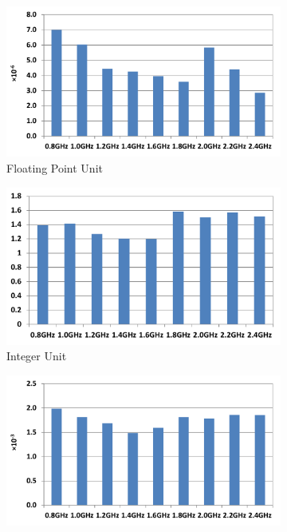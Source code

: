 \begin{figure}[htb]
   \centering
    \begin{subfigure}{.48\textwidth}
        \centering
        \includegraphics[width=\textwidth]{Chapter3/Figs/activity/FP.pdf}
        \caption{Floating Point Unit}
        \label{fig: lbmfp}
    \end{subfigure}
    \begin{subfigure}{.48\textwidth}
        \centering
        \includegraphics[width=\textwidth]{Chapter3/Figs/activity/INT.pdf}
        \caption{Integer Unit}
        \label{fig: lbmINT}
    \end{subfigure}
    \begin{subfigure}{.48\textwidth}
        \centering
        \includegraphics[width=\textwidth]{Chapter3/Figs/activity/L3.pdf}

\end{subfigure}
\end{figure}
